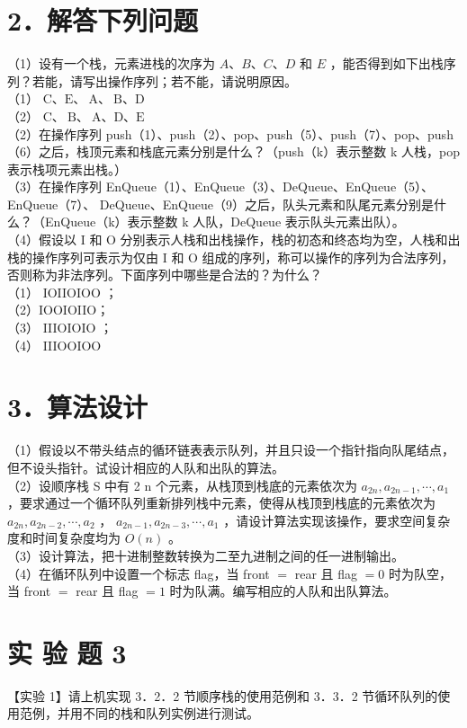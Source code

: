 \documentclass[10pt]{article}
\begin{document}
\section*{2．解答下列问题}
（1）设有一个栈，元素进栈的次序为 $A 、 B 、 C 、 D$ 和 $E$ ，能否得到如下出栈序列？若能，请写出操作序列；若不能，请说明原因。\\
（1） $\mathrm{C} 、 \mathrm{E} 、 \mathrm{~A} 、 \mathrm{~B} 、 \mathrm{D}$\\
（2） $\mathrm{C} 、 \mathrm{~B} 、 \mathrm{~A} 、 \mathrm{D} 、 \mathrm{E}$\\
（2）在操作序列 push（1）、push（2）、pop、push（5）、push（7）、pop、push（6）之后，栈顶元素和栈底元素分别是什么？（push（k）表示整数 k 人栈，pop 表示栈项元素出栈。）\\
（3）在操作序列 EnQueue（1）、EnQueue（3）、DeQueue、EnQueue（5）、EnQueue（7）、 DeQueue、EnQueue（9）之后，队头元素和队尾元素分别是什么？（EnQueue（k）表示整数 k 人队，DeQueue 表示队头元素出队）。\\
（4）假设以 I 和 O 分别表示人栈和出栈操作，栈的初态和终态均为空，人栈和出栈的操作序列可表示为仅由 I 和 O 组成的序列，称可以操作的序列为合法序列，否则称为非法序列。下面序列中哪些是合法的？为什么？\\
（1） IOIIOIOO ；\\
（2）IOOIOIIO；\\
（3） IIIOIOIO ；\\
（4） IIIOOIOO

\section*{3．算法设计}
（1）假设以不带头结点的循环链表表示队列，并且只设一个指针指向队尾结点，但不设头指针。试设计相应的人队和出队的算法。\\
（2）设顺序栈 S 中有 2 n 个元素，从栈顶到栈底的元素依次为 $a_{2 n}, a_{2 n-1}, \cdots, a_{1}$ ，要求通过一个循环队列重新排列栈中元素，使得从栈顶到栈底的元素依次为 $a_{2 n}, a_{2 n-2}, \cdots, a_{2}$ ， $a_{2 n-1}, a_{2 n-3}, \cdots, a_{1}$ ，请设计算法实现该操作，要求空间复杂度和时间复杂度均为 $O(n)$ 。\\
（3）设计算法，把十进制整数转换为二至九进制之间的任一进制输出。\\
（4）在循环队列中设置一个标志 flag，当 front $=$ rear 且 flag $=0$ 时为队空，当 front $=$ rear 且 flag $=1$ 时为队满。编写相应的人队和出队算法。

\section*{实 验 题 3}
【实验 1】请上机实现 3．2．2 节顺序栈的使用范例和 3．3．2 节循环队列的使用范例，并用不同的栈和队列实例进行测试。
\end{document}
